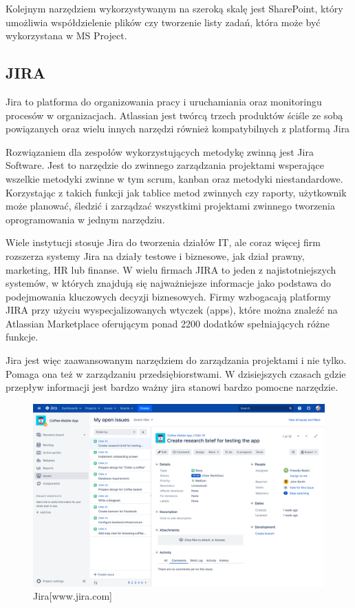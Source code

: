 Kolejnym narzędziem wykorzystywanym na szeroką skalę jest SharePoint,
który umożliwia współdzielenie plików czy tworzenie listy zadań,
która może być wykorzystana w MS Project.

\subsection{JIRA}

Jira to platforma do organizowania pracy i uruchamiania oraz monitoringu procesów w organizacjach.
Atlassian jest twórcą trzech produktów ściśle ze sobą powiązanych oraz wielu innych narzędzi również kompatybilnych z platformą Jira\cite{www_jira}

Rozwiązaniem dla zespołów wykorzystujących metodykę zwinną jest Jira Software.
Jest to narzędzie do zwinnego zarządzania projektami wsperające wszelkie metodyki zwinne w tym scrum,
kanban oraz metodyki niestandardowe.
Korzystając z takich funkcji jak tablice metod zwinnych czy raporty,
użytkownik może planować,
śledzić i zarządzać wszystkimi projektami zwinnego tworzenia oprogramowania w jednym narzędziu.~\cite{www_agile_jira}

Wiele instytucji stosuje Jira do tworzenia działów IT,
ale coraz więcej firm rozszerza systemy Jira na działy testowe i biznesowe, jak dział prawny, marketing, HR lub finanse.
W wielu firmach JIRA to jeden z najistotniejszych systemów, w których znajdują się najważniejsze informacje jako podstawa do podejmowania kluczowych decyzji biznesowych.
Firmy wzbogacają platformy JIRA przy użyciu wyspecjalizowanych wtyczek (apps), które można znaleźć na Atlassian Marketplace oferującym ponad 2200 dodatków spełniających różne funkcje.\cite{www_jira}

Jira jest więc zaawansowanym narzędziem do zarządzania projektami i nie tylko.
Pomaga ona też w zarządzaniu przedsiębiorstwami.
W dzisiejszych czasach gdzie przepływ informacji jest bardzo ważny jira stanowi bardzo pomocne narzędzie.

\begin{figure}[H]
	\centering\includegraphics[width=.8\textwidth]{img/jira.png}
	\caption{Jira[www.jira.com]}\label{rys:trello}%
\end{figure}

